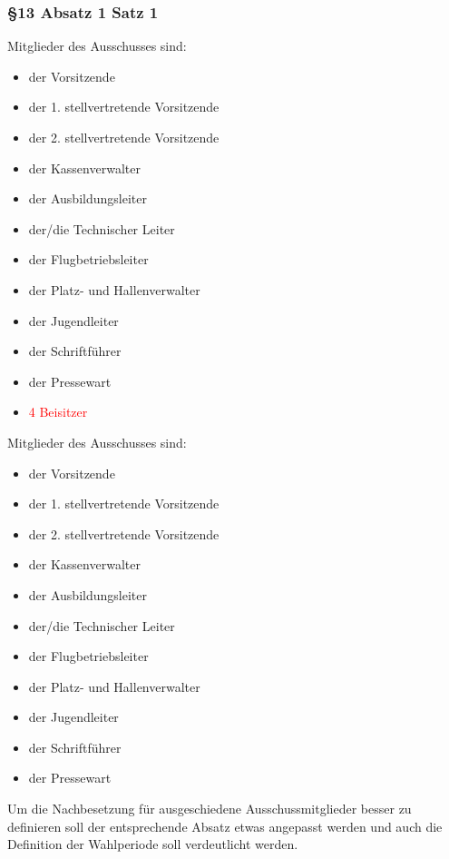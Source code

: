 \documentclass[10pt,a4paper,parskip=half]{scrartcl}
\newcommand{\old}[1]{\textcolor{Red}{#1}}
\newcommand{\change}[1]{
  \begin{adjustwidth}{20pt}{20pt}
    #1
  \end{adjustwidth}
}
\begin{document}
\change{
  \subsubsection*{§13 Absatz 1 Satz 1}
  \begin{multicols}{2}
    Mitglieder des Ausschusses sind:
    \begin{itemize}[noitemsep]
      \item der Vorsitzende
      \item der 1. stellvertretende Vorsitzende
      \item der 2. stellvertretende Vorsitzende
      \item der Kassenverwalter
      \item der Ausbildungsleiter
      \item der/die Technischer Leiter
      \item der Flugbetriebsleiter
      \item der Platz- und Hallenverwalter
      \item der Jugendleiter
      \item der Schriftführer
      \item der Pressewart
      \item \old{4 Beisitzer}
    \end{itemize}
    \columnbreak
    Mitglieder des Ausschusses sind:
    \begin{itemize}[noitemsep]
      \item der Vorsitzende
      \item der 1. stellvertretende Vorsitzende
      \item der 2. stellvertretende Vorsitzende
      \item der Kassenverwalter
      \item der Ausbildungsleiter
      \item der/die Technischer Leiter
      \item der Flugbetriebsleiter
      \item der Platz- und Hallenverwalter
      \item der Jugendleiter
      \item der Schriftführer
      \item der Pressewart
    \end{itemize}
  \end{multicols}
}

Um die Nachbesetzung für ausgeschiedene Ausschussmitglieder besser zu definieren soll der entsprechende Absatz etwas angepasst werden und auch die Definition der Wahlperiode soll verdeutlicht werden.
\end{document}
